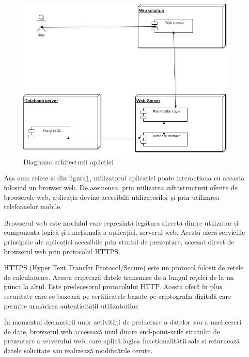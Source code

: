\documentclass[12pt,a4paper]{report}
\theoremstyle{definition}
\theoremstyle{remark}
\begin{document}
\begin{figure}[H]
    \centering
    \includegraphics[width=0.75\linewidth]{resurse/diagrame/Diagrama_Arhitectura2.drawio.png}
    \caption{Diagrama arhitecturii aplicției}\label{fig:arhitect}
\end{figure}

\par Așa cum reiese și din figura\ref{fig:arhitect}, utilizatorul aplicației poate interacționa cu aceasta folosind un browser web. De asemenea, prin utilizarea infrastructurii oferite de browserele web, aplicația devine accesibilă utilizatorilor și prin utilizarea telefoanelor mobile. 

\par Browserul web este modulul care reprezintă legătura directă dintre utilizator și componenta logică și funcțională a aplicației, serverul web. Acesta oferă serviciile principale ale aplicației accesibile prin stratul de prezentare, accesat direct de browserul web prin protocolul HTTPS\@.

\par HTTPS (Hyper Text Transfer Protocol/Secure) este un protocol folosit de rețele de calculatoare. Acesta criptează datele transmise de-a lungul rețelei de la un punct la altul. Este predecesorul protocolului HTTP\@. Acesta oferă în plus securitate care se bazează pe certificatele bazate pe criptografia digitală care permite urmărirea autenticității utilizatorilor.

\par În momentul declanșării unor activități de prelucrare a datelor sau a unei cereri de date, browserul web accesează unul dintre end-point-urile stratului de prezentare a serverului web, care aplică logica funcționalității sale si returnează datele solicitate sau realizează modificările cerute.
\end{document}
